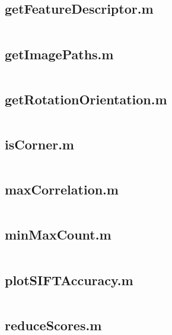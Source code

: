 \documentclass[11pt]{article}
\begin{document}
\begin{appendices}
\subsection*{getFeatureDescriptor.m}
\label{sec:getFeatureDescriptor.m}
\inputminted[breaklines=true,breakanywhere=true,fontsize=\small]{matlab}{../src/getFeatureDescriptor.m}

\subsection*{getImagePaths.m}
\label{sec:getImagePaths.m}
\inputminted[breaklines=true,breakanywhere=true,fontsize=\small]{matlab}{../src/getImagePaths.m}

\subsection*{getRotationOrientation.m}
\label{sec:getRotationOrientation.m}
\inputminted[breaklines=true,breakanywhere=true,fontsize=\small]{matlab}{../src/getRotationOrientation.m}

\subsection*{isCorner.m}
\label{sec:isCorner.m}
\inputminted[breaklines=true,breakanywhere=true,fontsize=\small]{matlab}{../src/isCorner.m}

\subsection*{maxCorrelation.m} 
\label{sec:maxCorrelation.m}
\inputminted[breaklines=true,breakanywhere=true,fontsize=\small]{matlab}{../src/maxCorrelation.m}

\subsection*{minMaxCount.m} 
\label{sec:minMaxCount.m}
\inputminted[breaklines=true,breakanywhere=true,fontsize=\small]{matlab}{../src/minMaxCount.m}

\subsection*{plotSIFTAccuracy.m}
\label{sec:plotSIFTAccuracy.m}
\inputminted[breaklines=true,breakanywhere=true,fontsize=\small]{matlab}{../src/plotSIFTAccuracy.m}

\subsection*{reduceScores.m}
\label{sec:reduceScores.m}
\inputminted[breaklines=true,breakanywhere=true,fontsize=\small]{matlab}{../src/reduceScores.m}


\end{appendices}
\end{document}
